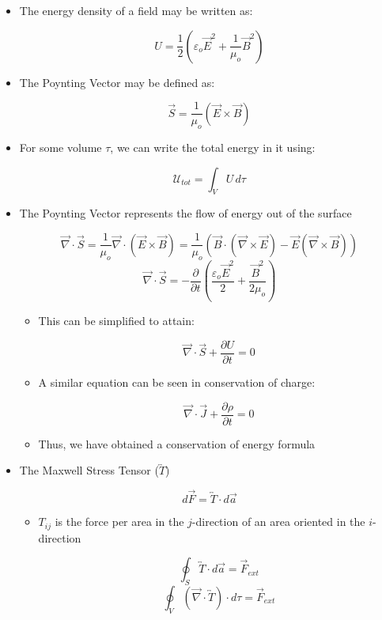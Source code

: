 \begin{itemize}

  \item The energy density of a field may be written as:

    $$U=\frac{1}{2}\left( \varepsilon_o\vec{E}^2+\frac{1}{\mu_o}\vec{B}^2 \right)$$

  \item The Poynting Vector may be defined as:

    $$\vec{S}=\frac{1}{\mu_o}(\vec{E}\times\vec{B})$$

  \item For some volume $\tau$, we can write the total energy in it using:

    $$\mathcal{U}_{tot}=\int_V U\,d\tau$$

  \item The Poynting Vector represents the flow of energy out of the surface

    $$\vec{\nabla}\cdot\vec{S}=\frac{1}{\mu_o}\vec{\nabla}\cdot(\vec{E}\times\vec{B})=\frac{1}{\mu_o}\left( \vec{B}\cdot(\vec{\nabla}\times\vec{E})-\vec{E}(\vec{\nabla}\times\vec{B}) \right)$$
    $$\vec{\nabla}\cdot\vec{S}=-\frac{\partial}{\partial t}\left( \frac{\varepsilon_o\vec{E}^2}{2}+\frac{\vec{B}^2}{2\mu_o} \right)$$

    \begin{itemize}

      \item This can be simplified to attain:

        $$\vec{\nabla}\cdot\vec{S}+\frac{\partial U}{\partial t}=0$$

      \item A similar equation can be seen in conservation of charge:

        $$\vec{\nabla}\cdot\vec{J}+\frac{\partial \rho}{\partial t}=0$$

      \item Thus, we have obtained a conservation of energy formula

    \end{itemize}

  \item The Maxwell Stress Tensor ($\overleftrightarrow{T}$)

    $$d\vec{F}=\overleftrightarrow{T}\cdot d\vec{a}$$

    \begin{itemize}

      \item $T_{ij}$ is the force per area in the $j$-direction of an area oriented in the $i$-direction

        $$\oint_S\overleftrightarrow{T}\cdot d\vec{a}=\vec{F}_{ext}$$
        $$\oint_V(\vec{\nabla}\cdot\overleftrightarrow{T})\cdot d\tau=\vec{F}_{ext}$$

    \end{itemize}

\end{itemize}



